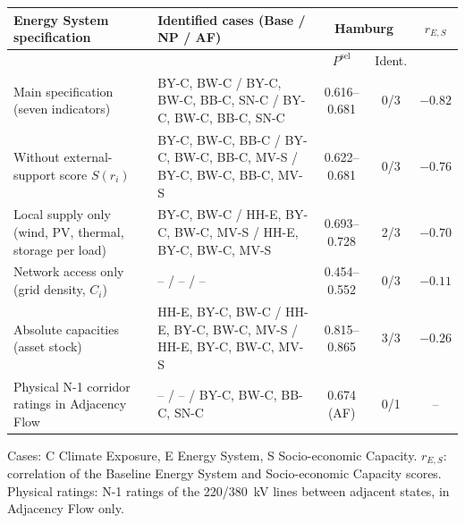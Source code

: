 \begin{tabular}{@{}>{\raggedright\arraybackslash}p{5.0cm}>{\raggedright\arraybackslash}p{7.4cm}ccc@{}}
\toprule
Energy System specification & Identified cases (Base / NP / AF) & \multicolumn{2}{c}{Hamburg} & $r_{E,S}$ \\
\cmidrule(lr){3-4}
 & & $P^{\mathrm{sel}}$ & Ident. & \\
\midrule
Main specification (seven indicators) & BY-C, BW-C / BY-C, BW-C, BB-C, SN-C / BY-C, BW-C, BB-C, SN-C & 0.616--0.681 & 0/3 & $-0.82$ \\
Without external-support score $S(r_i)$ & BY-C, BW-C, BB-C / BY-C, BW-C, BB-C, MV-S / BY-C, BW-C, BB-C, MV-S & 0.622--0.681 & 0/3 & $-0.76$ \\
Local supply only (wind, PV, thermal, storage per load) & BY-C, BW-C / HH-E, BY-C, BW-C, MV-S / HH-E, BY-C, BW-C, MV-S & 0.693--0.728 & 2/3 & $-0.70$ \\
Network access only (grid density, $C_i$) & -- / -- / -- & 0.454--0.552 & 0/3 & $-0.11$ \\
Absolute capacities (asset stock) & HH-E, BY-C, BW-C / HH-E, BY-C, BW-C, MV-S / HH-E, BY-C, BW-C, MV-S & 0.815--0.865 & 3/3 & $-0.26$ \\
Physical N-1 corridor ratings in Adjacency Flow & -- / -- / BY-C, BW-C, BB-C, SN-C & 0.674 (AF) & 0/1 & -- \\
\bottomrule
\end{tabular}
\par\smallskip\raggedright\scriptsize Cases: C Climate Exposure, E Energy System, S Socio-economic Capacity. $r_{E,S}$: correlation of the Baseline Energy System and Socio-economic Capacity scores. Physical ratings: N-1 ratings of the 220/380~kV lines between adjacent states, in Adjacency Flow only.
